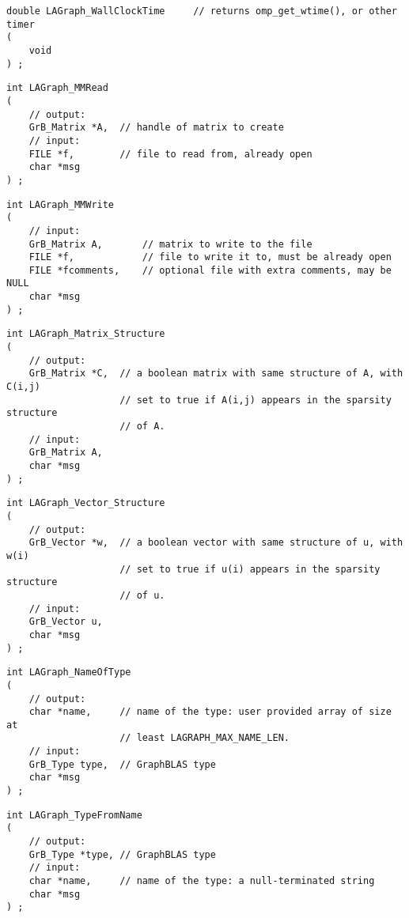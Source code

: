 \begin{verbatim}
double LAGraph_WallClockTime     // returns omp_get_wtime(), or other timer
(
    void
) ;
\end{verbatim}




\begin{verbatim}
int LAGraph_MMRead
(
    // output:
    GrB_Matrix *A,  // handle of matrix to create
    // input:
    FILE *f,        // file to read from, already open
    char *msg
) ;
\end{verbatim}




\begin{verbatim}
int LAGraph_MMWrite
(
    // input:
    GrB_Matrix A,       // matrix to write to the file
    FILE *f,            // file to write it to, must be already open
    FILE *fcomments,    // optional file with extra comments, may be NULL
    char *msg
) ;
\end{verbatim}




\begin{verbatim}
int LAGraph_Matrix_Structure
(
    // output:
    GrB_Matrix *C,  // a boolean matrix with same structure of A, with C(i,j)
                    // set to true if A(i,j) appears in the sparsity structure
                    // of A.
    // input:
    GrB_Matrix A,
    char *msg
) ;
\end{verbatim}




\begin{verbatim}
int LAGraph_Vector_Structure
(
    // output:
    GrB_Vector *w,  // a boolean vector with same structure of u, with w(i)
                    // set to true if u(i) appears in the sparsity structure
                    // of u.
    // input:
    GrB_Vector u,
    char *msg
) ;
\end{verbatim}




\begin{verbatim}
int LAGraph_NameOfType
(
    // output:
    char *name,     // name of the type: user provided array of size at
                    // least LAGRAPH_MAX_NAME_LEN.
    // input:
    GrB_Type type,  // GraphBLAS type
    char *msg
) ;
\end{verbatim}




\begin{verbatim}
int LAGraph_TypeFromName
(
    // output:
    GrB_Type *type, // GraphBLAS type
    // input:
    char *name,     // name of the type: a null-terminated string
    char *msg
) ;
\end{verbatim}




